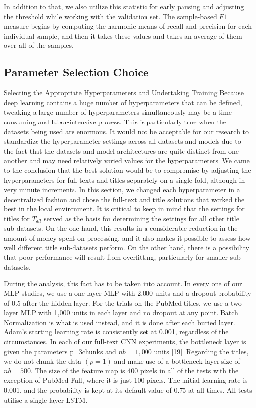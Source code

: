 \documentclass[a4paper]{article}
\begin{document}
In addition to that, we also utilize this statistic for early pausing and adjusting the threshold while working with the validation set. The sample-based $F1$ measure begins by computing the harmonic means of recall and precision for each individual sample, and then it takes these values and takes an average of them over all of the samples.

\subsection{Parameter Selection Choice}
Selecting the Appropriate Hyperparameters and Undertaking Training Because deep learning contains a huge number of hyperparameters that can be defined, tweaking a large number of hyperparameters simultaneously may be a time-consuming and labor-intensive process. This is particularly true when the datasets being used are enormous. It would not be acceptable for our research to standardize the hyperparameter settings across all datasets and models due to the fact that the datasets and model architectures are quite distinct from one another and may need relatively varied values for the hyperparameters. We came to the conclusion that the best solution would be to compromise by adjusting the hyperparameters for full-texts and titles separately on a single fold, although in very minute increments. In this section, we changed each hyperparameter in a decentralized fashion and chose the full-text and title solutions that worked the best in the local environment. It is critical to keep in mind that the settings for titles for $T_{all}$  served as the basis for determining the settings for all other title sub-datasets. On the one hand, this results in a considerable reduction in the amount of money spent on processing, and it also makes it possible to assess how well different title sub-datasets perform. On the other hand, there is a possibility that poor performance will result from overfitting, particularly for smaller sub-datasets.

During the analysis, this fact has to be taken into account. In every one of our MLP studies, we use a one-layer MLP with 2,000 units and a dropout probability of 0.5 after the hidden layer. For the trials on the PubMed titles, we use a two-layer MLP with 1,000 units in each layer and no dropout at any point. Batch Normalization is what is used instead, and it is done after each buried layer. Adam's starting learning rate is consistently set at 0.001, regardless of the circumstances. In each of our full-text CNN experiments, the bottleneck layer is given the parameters p=3chunks and $nb=1,000$ units [19]. Regarding the titles, we do not chunk the data $(p = 1)$ and make use of a bottleneck layer size of $nb = 500$. The size of the feature map is 400 pixels in all of the tests with the exception of PubMed Full, where it is just 100 pixels. The initial learning rate is 0.001, and the probability is kept at its default value of 0.75 at all times. All tests utilise a single-layer LSTM.
\end{document}
